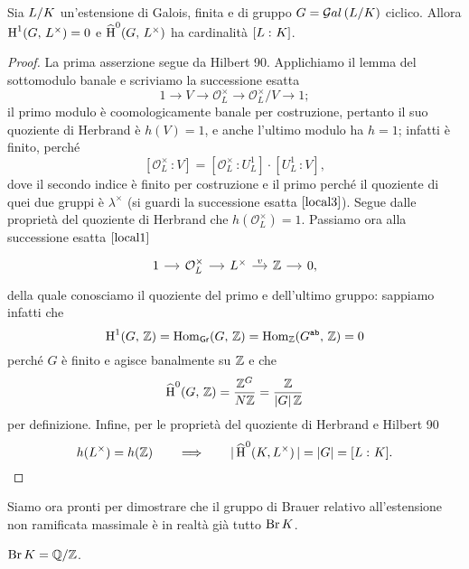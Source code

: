 \begin{theorem} \label{assioma}
	Sia $ L/K $ un'estensione di Galois, finita e di gruppo $ G = \mathcal{G}al\left( L/K \right) $ ciclico. Allora $ \operatorname{H}^1(G, \, L^\times) = 0 $ e $ \operatorname{\widehat{H}}^0(G, \, L^\times) $ ha cardinalità $ [L \, \colon K] $.
\end{theorem}
\begin{proof}
	La prima asserzione segue da Hilbert 90. Applichiamo il lemma del sottomodulo banale e scriviamo la successione esatta 
	\[ 1 \to V \to \mathcal{O}_L^\times \to \mathcal{O}_L^\times/V \to 1; \]
	il primo modulo è coomologicamente banale per costruzione, pertanto il suo quoziente di Herbrand è $ h(V) = 1 $, e anche l'ultimo modulo ha $ h = 1 $; infatti è finito, perché $$  [\mathcal{O}_L^\times \, \colon V] = [\mathcal{O}_L^\times \,\colon U_L^1]\cdot[U_L^1 \,\colon V],  $$
	dove il secondo indice è finito per costruzione e il primo perché il quoziente di quei due gruppi è $ \lambda^\times $ (si guardi la successione esatta $ \ref{local3} $). Segue dalle proprietà del quoziente di Herbrand che $ h(\mathcal{O}_L^\times) = 1 $. Passiamo ora alla successione esatta $ \ref{local1} $
	\[ \begin{tikzcd}[column sep = small]
	1 \rar
	& \mathcal{O}_{L}^\times \rar
	& L^\times \rar["v"]
	& \Z \rar
	& 0,
	\end{tikzcd} \]
	della quale conosciamo il quoziente del primo e dell'ultimo gruppo: sappiamo infatti che $$  \operatorname{H}^1(G, \, \mathbb{Z}) = \operatorname{Hom}_\mathsf{Gr}(G, \, \mathbb{Z}) = \operatorname{Hom}_{\mathbb{Z}}(G^\texttt{ab}, \, \mathbb{Z}) = 0  $$ perché $ G $ è finito e agisce banalmente su $ \mathbb{Z} $ e che $$  \operatorname{\widehat{H}}^0(G, \, \mathbb{Z}) = \frac{\mathbb{Z}^G}{ N\mathbb{Z}} = \frac{\mathbb{Z}}{ |G|\, \mathbb{Z}}  $$ per definizione. Infine, per le proprietà del quoziente di Herbrand e Hilbert 90
	\[ h(L^\times) = h(\mathbb{Z}) \qquad\Longrightarrow\qquad |\operatorname{\widehat{H}}^0(K, L^\times)\, | = |G| = [L \, \colon K]. \]
\end{proof}


Siamo ora pronti per dimostrare che il gruppo di Brauer relativo all'estensione non ramificata massimale è in realtà già tutto $ \operatorname{Br} K $.

\begin{theorem}
	$ \operatorname{Br} K = \mathbb{Q}/\mathbb{Z} $.
\end{theorem}

